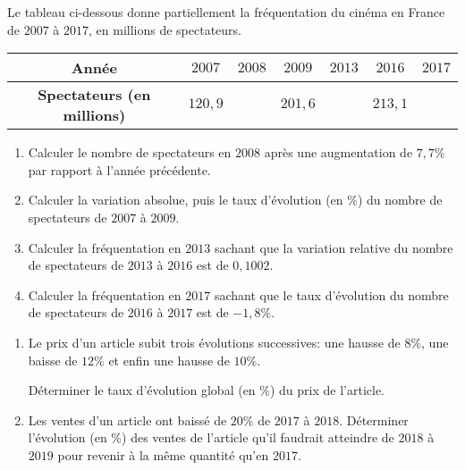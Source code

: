 \documentclass[a4paper]{article}
\begin{document}
  
  \medskip
  \pagebreak
  \begin{exerciceinterro}{}{}
  
    Le tableau ci-dessous donne partiellement la fréquentation du cinéma en France de $2007$ à $2017$, en millions de spectateurs.
  
  
  \begin{center}
    \begin{tabular}{|c|c|c|c|c|c|c|}
      \hline 
      \cellcolor{Blue!15!white}\textbf{Année} &  $2007$ & $2008$ & $2009$ & $2013$ & $2016$ & $2017$\\
      \hline
      \cellcolor{Blue!15!white}\textbf{Spectateurs (en millions)} & $120,9$ & & $201,6$ & & $213,1$ & \\
      \hline
    \end{tabular}
  \end{center}
  
  \begin{enumerate}
    \item Calculer le nombre de spectateurs en $2008$ après une augmentation de $7,7\%$ par rapport à l'année précédente.
    \item Calculer la variation absolue, puis le taux d'évolution (en \%) du nombre de spectateurs de $2007$ à $2009$.
    \item Calculer la fréquentation en $2013$ sachant que la variation relative du nombre de spectateurs de $2013$ à $2016$ est de $0,1002$.
    \item Calculer la fréquentation en $2017$ sachant que le taux d'évolution du nombre de spectateurs de $2016$ à $2017$ est de $-1,8\%$.
  \end{enumerate}
  
  \end{exerciceinterro}
  
  
  \medskip
  
  \begin{exerciceinterro}{}{}
    \begin{enumerate}
      \item Le prix d'un article subit trois évolutions successives: une hausse de $8\%$, une baisse de $12\%$ et enfin une hausse de $10\%$.
      
      Déterminer le taux d'évolution global (en \%) du prix de l'article.
  
      \item Les ventes d'un article ont baissé de $20\%$ de $2017$ à $2018$.
      Déterminer l'évolution (en \%) des ventes de l'article qu'il faudrait atteindre de $2018$ à $2019$ pour
      revenir à la même quantité qu'en $2017$.
    \end{enumerate}
  \end{exerciceinterro}
  
\end{document}
